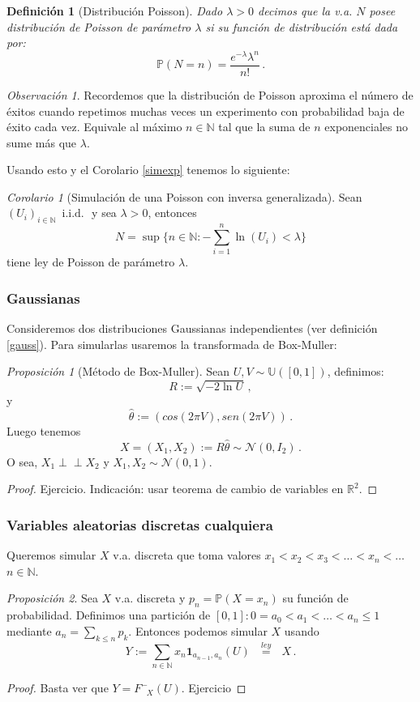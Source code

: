 \documentclass[letterpaper,11pt]{article} %
\theoremstyle{defbreak}
\newtheorem{definition}{Definición}[subsection]
\theoremstyle{propbreak}
\theoremstyle{remark}
\newtheorem{remark}{Observación}[subsection]
\theoremstyle{break}
\newtheorem{proposition}{Proposición}[subsection]
\newtheorem{corolary}{Corolario}[subsection]
\def\R{\mathbb{R}}
\def\P{\mathbb{P}}
\def\N{\mathbb{N}}
\def\normal{\mathcal{N}}
\def\unif{\mathbb{U}([0,1])}
\newcommand{\indep}{\perp \!\!\! \perp}
\def\ejercicio{\color{blue}Ejercicio\color{black}}
\def\iid{\mbox{ i.i.d. }}
\def\gris{\color{mygray}}
\def\negro{\color{black}}
\def\Finvgen{F^-_{\mbox{ }X}}
\def\igualley{\mbox{ }\overset{ley}{=}\mbox{ }}
\begin{document}
\begin{definition}[Distribución Poisson]
Dado $\lambda>0$ decimos que la v.a. $N$ posee distribución de Poisson de parámetro $\lambda$ si su función de distribución está dada por:
$$ \P(N=n)=\displaystyle\frac{e^{-\lambda}\lambda^n}{n!} \, .$$
\end{definition}
\begin{remark}
Recordemos que la distribución de Poisson aproxima el número de éxitos cuando repetimos muchas veces un experimento con probabilidad baja de éxito cada vez. Equivale al máximo $n\in\N$ tal que la suma de $n$ exponenciales no sume más que $\lambda$.
\end{remark}
Usando esto y el Corolario \ref{simexp} tenemos lo siguiente:
\begin{corolary}[Simulación de una Poisson con inversa generalizada]
Sean $(U_i)_{i\in\N} \, \iid$ y sea $\lambda>0$, entonces
$$ N = \sup\{n\in\N : \displaystyle - \sum^n_{i=1}\ln(U_i)<\lambda\}$$
tiene ley de Poisson de parámetro $\lambda$.
\end{corolary}
\subsubsection{Gaussianas}
Consideremos dos distribuciones Gaussianas independientes (ver definición \ref{gauss}). Para simularlas usaremos la transformada de Box-Muller:

\begin{proposition}[Método de Box-Muller] 
Sean $U,V\sim\unif$, definimos:
$$R:=\displaystyle\sqrt{-2 \ln U}\, ,$$ y $$ \hat{\theta}:=(cos(2\pi V),sen(2\pi V)) \, .$$
Luego tenemos
$$ X=(X_1,X_2):=R\hat{\theta}\sim\normal(0,I_2) \, .$$
O sea, $X_1\indep X_2$ y $X_1,X_2\sim\normal(0,1)$.
\end{proposition}
\begin{proof}
\ejercicio. \gris Indicación: usar teorema de cambio de variables en $\R^2$. \negro
\end{proof}

\subsubsection{Variables aleatorias discretas cualquiera}
\label{disc}
Queremos simular $X$ v.a. discreta que toma valores $x_1<x_2<x_3<\dots<x_n<\dots$ $n\in\N$.
\begin{proposition}
Sea $X$ v.a. discreta y $p_n=\P(X=x_n)$ su función de probabilidad. Definimos una partición de $[0,1]:0=a_0<a_1<\dots<a_n\leq1$ mediante $a_n=\sum_{k\leq n}p_k$. Entonces podemos simular $X$ usando
$$ Y:=\displaystyle\sum_{n\in\N}x_n \mathbf{1}_{a_{n-1},a_n}(U)\igualley X \, .$$
\end{proposition}
\begin{proof}
Basta ver que $Y=\Finvgen(U)$. \ejercicio
\end{proof}
\end{document}
